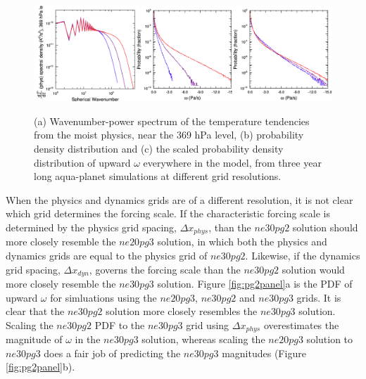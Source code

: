 \documentclass{agujournal}
\begin{document}
\begin{figure}[t]
\begin{center}
\noindent\includegraphics[width=30pc,angle=0]{figs/pg3panel.png}\\
\end{center}
\caption{(a) Wavenumber-power spectrum of the temperature tendencies from the moist physics, near the 369 hPa level, (b) probability density distribution and (c) the scaled probability density distribution of upward $\omega$ everywhere in the model, from three year long aqua-planet simulations at different grid resolutions.}
\label{fig:pg3panel}
\end{figure}

When the physics and dynamics grids are of a different resolution, it is not clear which grid determines the forcing scale. If the characteristic forcing scale is determined by the physics grid spacing, $\Delta x_{phys}$, than the $ne30pg2$ solution should more closely resemble the $ne20pg3$ solution, in which both the physics and dynamics grids are equal to the physics grid of $ne30pg2$. Likewise, if the dynamics grid spacing, $\Delta x_{dyn}$, governs the forcing scale than the $ne30pg2$ solution would more closely resemble the $ne30pg3$ solution. Figure \ref{fig:pg2panel}a is the  PDF of upward $\omega$ for simluations using the $ne20pg3$, $ne30pg2$ and $ne30pg3$ grids. It is clear that the $ne30pg2$ solution more closely resembles the $ne30pg3$ solution. Scaling the $ne30pg2$ PDF to the $ne30pg3$ grid using $\Delta x_{phys}$ overestimates the magnitude of $\omega$ in the $ne30pg3$ solution, whereas scaling the $ne20pg3$ solution to $ne30pg3$ does a fair job of predicting the $ne30pg3$ magnitudes (Figure \ref{fig:pg2panel}b). 
\end{document}
